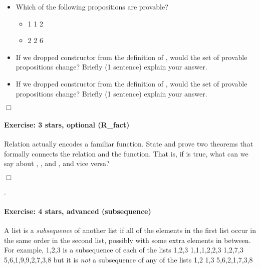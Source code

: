 \documentclass[12pt]{report}
\begin{document}
\begin{itemize}
\item  Which of the following propositions are provable?

\begin{itemize}
\item  {} 1 1 2

\item  {} 2 2 6





\end{itemize}

\item  If we dropped constructor  from the definition of ,
      would the set of provable propositions change?  Briefly (1
      sentence) explain your answer.



\item  If we dropped constructor  from the definition of ,
      would the set of provable propositions change?  Briefly (1
      sentence) explain your answer.

\end{itemize}


\ensuremath{\Box}


\paragraph{Exercise: 3 stars, optional (R\_fact)}

 Relation  actually encodes a familiar function.  State and prove two
    theorems that formally connects the relation and the function. 
    That is, if     is true, what can we say about ,
    , and , and vice versa?
\begin{coqdoccode}
\coqdocemptyline
\end{coqdoccode}
\ensuremath{\Box} \begin{coqdoccode}
\coqdocemptyline
\coqdocnoindent
{} .\coqdoceol
\coqdocemptyline
\end{coqdoccode}
\paragraph{Exercise: 4 stars, advanced (subsequence)}

 A list is a \textit{subsequence} of another list if all of the elements
    in the first list occur in the same order in the second list,
    possibly with some extra elements in between. For example,
    1,2,3
    is a subsequence of each of the lists
    1,2,3
    1,1,1,2,2,3
    1,2,7,3
    5,6,1,9,9,2,7,3,8
    but it is \textit{not} a subsequence of any of the lists
    1,2
    1,3
    5,6,2,1,7,3,8
\end{document}
